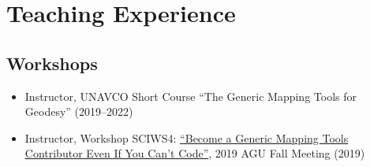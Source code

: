 \section{Teaching Experience}

\subsection{Workshops}
\begin{itemize}
\item Instructor, UNAVCO Short Course ``The Generic Mapping Tools for Geodesy'' (2019--2022)
\item Instructor, Workshop SCIWS4: \href{https://www.agu.org/Events/SCIWS4-Generic-Mapping-Tools}{``Become a Generic Mapping Tools Contributor Even If You Can't Code''}, 2019 AGU Fall Meeting (2019)
\end{itemize}
